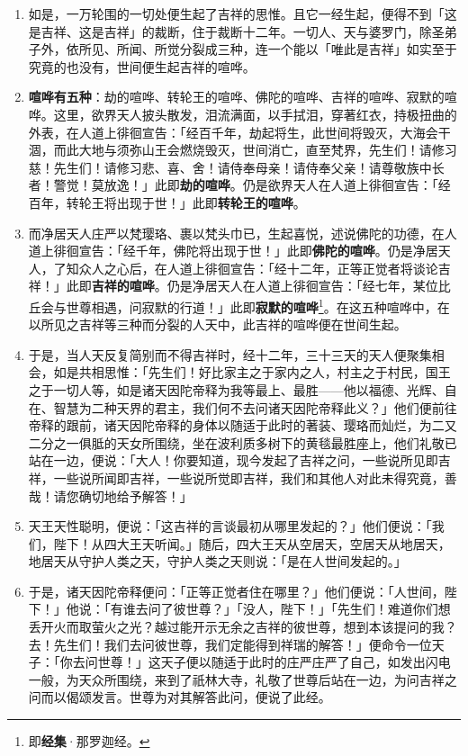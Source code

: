 \begin{enumerate}
\item 如是，一万轮围的一切处便生起了吉祥的思惟。且它一经生起，便得不到「这是吉祥、这是吉祥」的裁断，住于裁断十二年。一切人、天与婆罗门，除圣弟子外，依所见、所闻、所觉分裂成三种，连一个能以「唯此是吉祥」如实至于究竟的也没有，世间便生起吉祥的喧哗。
\item \textbf{喧哗有五种}：劫的喧哗、转轮王的喧哗、佛陀的喧哗、吉祥的喧哗、寂默的喧哗。这里，欲界天人披头散发，泪流满面，以手拭泪，穿著红衣，持极扭曲的外表，在人道上徘徊宣告：「经百千年，劫起将生，此世间将毁灭，大海会干涸，而此大地与须弥山王会燃烧毁灭，世间消亡，直至梵界，先生们！请修习慈！先生们！请修习悲、喜、舍！请侍奉母亲！请侍奉父亲！请尊敬族中长者！警觉！莫放逸！」此即\textbf{劫的喧哗}。仍是欲界天人在人道上徘徊宣告：「经百年，转轮王将出现于世！」此即\textbf{转轮王的喧哗}。
\item 而净居天人庄严以梵璎珞、裹以梵头巾已，生起喜悦，述说佛陀的功德，在人道上徘徊宣告：「经千年，佛陀将出现于世！」此即\textbf{佛陀的喧哗}。仍是净居天人，了知众人之心后，在人道上徘徊宣告：「经十二年，正等正觉者将谈论吉祥！」此即\textbf{吉祥的喧哗}。仍是净居天人在人道上徘徊宣告：「经七年，某位比丘会与世尊相遇，问寂默的行道！」此即\textbf{寂默的喧哗}\footnote{即\textbf{经集}·那罗迦经。}。在这五种喧哗中，在以所见之吉祥等三种而分裂的人天中，此吉祥的喧哗便在世间生起。
\item 于是，当人天反复简别而不得吉祥时，经十二年，三十三天的天人便聚集相会，如是共相思惟：「先生们！好比家主之于家内之人，村主之于村民，国王之于一切人等，如是诸天因陀帝释为我等最上、最胜——他以福德、光辉、自在、智慧为二种天界的君主，我们何不去问诸天因陀帝释此义？」他们便前往帝释的跟前，诸天因陀帝释的身体以随适于此时的著装、璎珞而灿烂，为二又二分之一俱胝的天女所围绕，坐在波利质多树下的黄毯最胜座上，他们礼敬已站在一边，便说：「大人！你要知道，现今发起了吉祥之问，一些说所见即吉祥，一些说所闻即吉祥，一些说所觉即吉祥，我们和其他人对此未得究竟，善哉！请您确切地给予解答！」
\item 天王天性聪明，便说：「这吉祥的言谈最初从哪里发起的？」他们便说：「我们，陛下！从四大王天听闻。」随后，四大王天从空居天，空居天从地居天，地居天从守护人类之天，守护人类之天则说：「是在人世间发起的。」
\item 于是，诸天因陀帝释便问：「正等正觉者住在哪里？」他们便说：「人世间，陛下！」他说：「有谁去问了彼世尊？」「没人，陛下！」「先生们！难道你们想丢开火而取萤火之光？越过能开示无余之吉祥的彼世尊，想到本该提问的我？去！先生们！我们去问彼世尊，我们定能得到祥瑞的解答！」便命令一位天子：「你去问世尊！」这天子便以随适于此时的庄严庄严了自己，如发出闪电一般，为天众所围绕，来到了祇林大寺，礼敬了世尊后站在一边，为问吉祥之问而以偈颂发言。世尊为对其解答此问，便说了此经。\end{enumerate}

